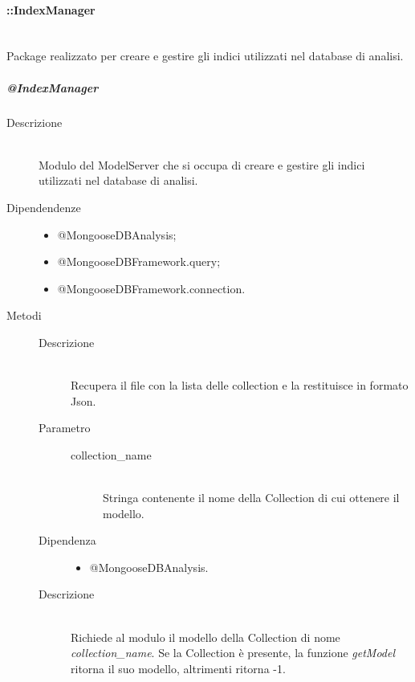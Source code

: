 \paragraph{::IndexManager} \hfill \\
Package realizzato per creare e gestire gli indici utilizzati nel database di analisi.
\subparagraph{@IndexManager} \hfill
\begin{description}
 \item[Descrizione] \hfill \\
 Modulo del ModelServer che si occupa di creare e gestire gli indici utilizzati nel database di analisi. 
 \item[Dipendendenze] \hfill
   \begin{itemize}
    \item @MongooseDBAnalysis;
    \item @MongooseDBFramework.query;
    \item @MongooseDBFramework.connection.
   \end{itemize}
 \item[Metodi]
  \begin{mldescription}
     	\begin{description}
     	 \item[Descrizione] \hfill \\
     	 Recupera il file con la lista delle collection e la restituisce in formato Json.
     	\end{description}
	\begin{description}
	 \item[Parametro] \hfill
	  \begin{description}
	   \item[collection\_name] \hfill \\
	   Stringa contenente il nome della Collection di cui ottenere il modello.
	  \end{description}
	 \item[Dipendenza] \hfill
	  \begin{itemize}
	   \item @MongooseDBAnalysis.
	  \end{itemize}
	 \item[Descrizione] \hfill \\
	 Richiede al modulo  il modello della Collection di nome \textit{collection\_name}. Se la Collection è presente, la funzione \textit{getModel} ritorna il suo modello, altrimenti ritorna -1.
	\end{description}	    
    

\end{mldescription}
\end{description}
